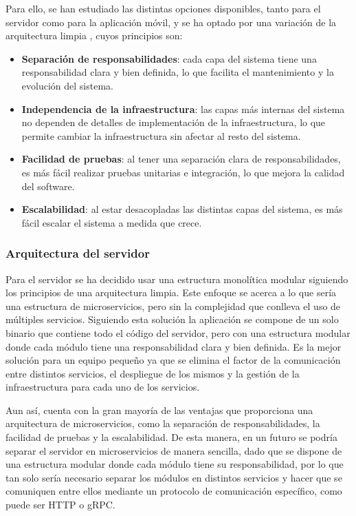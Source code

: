Para ello, se han estudiado las distintas opciones disponibles, tanto para el servidor como para la aplicación móvil, y se ha optado por una variación de la arquitectura limpia \parencite{uncle-bob-clean-architecture}, cuyos principios son:
\begin{itemize}
    \item \textbf{Separación de responsabilidades}: cada capa del sistema tiene una responsabilidad clara y bien definida, lo que facilita el mantenimiento y la evolución del sistema.
    \item \textbf{Independencia de la infraestructura}: las capas más internas del sistema no dependen de detalles de implementación de la infraestructura, lo que permite cambiar la infraestructura sin afectar al resto del sistema.
    \item \textbf{Facilidad de pruebas}: al tener una separación clara de responsabilidades, es más fácil realizar pruebas unitarias e integración, lo que mejora la calidad del software.
    \item \textbf{Escalabilidad}: al estar desacopladas las distintas capas del sistema, es más fácil escalar el sistema a medida que crece.
\end{itemize}

\subsubsection{Arquitectura del servidor}
Para el servidor se ha decidido usar una estructura monolítica modular siguiendo los principios de una arquitectura limpia.
Este enfoque se acerca a lo que sería una estructura de microservicios, pero sin la complejidad que conlleva el uso de múltiples servicios.
Siguiendo esta solución la aplicación se compone de un solo binario que contiene todo el código del servidor, pero con una estructura modular donde cada módulo tiene una responsabilidad clara y bien definida.
Es la mejor solución para un equipo pequeño ya que se elimina el factor de la comunicación entre distintos servicios, el despliegue de los mismos y la gestión de la infraestructura para cada uno de los servicios.

Aun así, cuenta con la gran mayoría de las ventajas que proporciona una arquitectura de microservicios, como la separación de responsabilidades, la facilidad de pruebas y la escalabilidad.
De esta manera, en un futuro se podría separar el servidor en microservicios de manera sencilla, dado que se dispone de una estructura modular donde cada módulo tiene su responsabilidad, por lo que tan solo sería necesario separar los módulos en distintos servicios y hacer que se comuniquen entre ellos mediante un protocolo de comunicación específico, como puede ser HTTP o gRPC.


